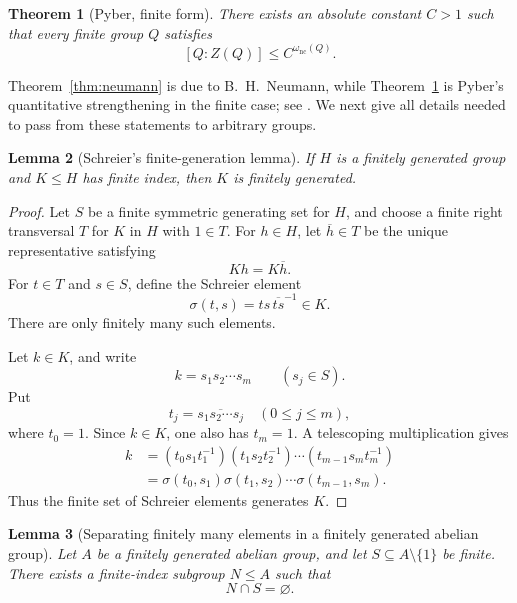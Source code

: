 \documentclass[11pt]{article}
\newtheorem{theorem}{Theorem}[section]
\newtheorem{lemma}[theorem]{Lemma}
\theoremstyle{definition}
\newcommand{\nc}{\omega_{\mathrm{nc}}}
\begin{document}
\begin{theorem}[Pyber, finite form]\label{thm:pyber-finite}
There exists an absolute constant $C>1$ such that every finite group $Q$
satisfies
\[
 [Q:Z(Q)]\le C^{\nc(Q)}.
\]
\end{theorem}

Theorem~\ref{thm:neumann} is due to B.~H.~Neumann, while
Theorem~\ref{thm:pyber-finite} is Pyber's quantitative strengthening in the
finite case; see \cite{Neumann,Pyber}.  We next give all details needed to
pass from these statements to arbitrary groups.

\begin{lemma}[Schreier's finite-generation lemma]\label{lem:schreier}
If $H$ is a finitely generated group and $K\le H$ has finite index, then
$K$ is finitely generated.
\end{lemma}

\begin{proof}
Let $S$ be a finite symmetric generating set for $H$, and choose a finite
right transversal $T$ for $K$ in $H$ with $1\in T$.  For $h\in H$, let
$\overline h\in T$ be the unique representative satisfying
\[
 Kh=K\overline h.
\]
For $t\in T$ and $s\in S$, define the Schreier element
\[
 \sigma(t,s)=ts\,\overline{ts}^{-1}\in K.
\]
There are only finitely many such elements.

Let $k\in K$, and write
\[
 k=s_1s_2\cdots s_m
 \qquad(s_j\in S).
\]
Put
\[
 t_j=\overline{s_1s_2\cdots s_j}
 \quad(0\le j\le m),
\]
where $t_0=1$.  Since $k\in K$, one also has $t_m=1$.  A telescoping
multiplication gives
\begin{align*}
 k
 &= (t_0s_1t_1^{-1})(t_1s_2t_2^{-1})\cdots
    (t_{m-1}s_mt_m^{-1})\\
 &=\sigma(t_0,s_1)\sigma(t_1,s_2)\cdots\sigma(t_{m-1},s_m).
\end{align*}
Thus the finite set of Schreier elements generates $K$.
\end{proof}

\begin{lemma}[Separating finitely many elements in a finitely generated
abelian group]\label{lem:fg-abelian-separation}
Let $A$ be a finitely generated abelian group, and let
$S\subseteq A\setminus\{1\}$ be finite.  There exists a finite-index subgroup
$N\le A$ such that
\[
 N\cap S=\varnothing.
\]
\end{lemma}
\end{document}
